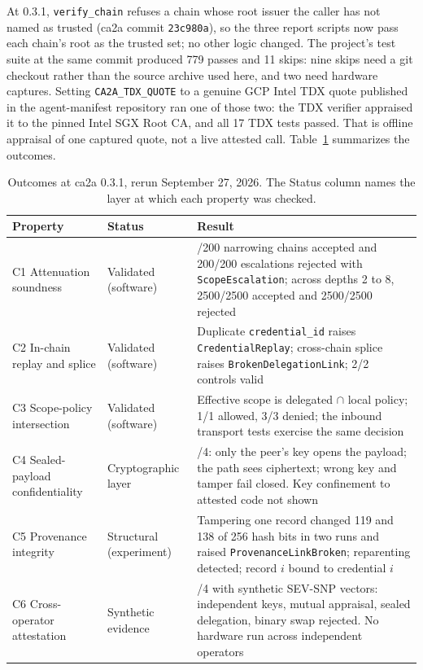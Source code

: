At 0.3.1, \texttt{verify\_chain} refuses a chain whose root issuer the caller has not named as
trusted (ca2a commit \texttt{23c980a}), so the three report scripts now pass each chain's root as
the trusted set; no other logic changed. The project's test suite at the same commit produced 779
passes and 11 skips: nine skips need a git checkout rather than the source archive used here, and
two need hardware captures. Setting \texttt{CA2A\_TDX\_QUOTE} to a genuine GCP Intel TDX quote
published in the agent-manifest repository ran one of those two: the TDX verifier appraised it to
the pinned Intel SGX Root CA, and all 17 TDX tests passed. That is offline appraisal of one
captured quote, not a live attested call. Table~\ref{tab:ca2a-results} summarizes the outcomes.

\begin{table}[h]
\centering
\caption{Outcomes at ca2a 0.3.1, rerun September 27, 2026. The Status column names the layer at
which each property was checked.}
\label{tab:ca2a-results}
\small
\begin{tabular}{>{\raggedright\arraybackslash}p{3.3cm}>{\raggedright\arraybackslash}p{2.6cm}>{\raggedright\arraybackslash}p{8.2cm}}
\toprule
Property & Status & Result \\
\midrule
C1 Attenuation soundness & Validated (software) & 200/200 narrowing chains accepted and 200/200 escalations rejected with \texttt{ScopeEscalation}; across depths 2 to 8, 2500/2500 accepted and 2500/2500 rejected \\
C2 In-chain replay and splice & Validated (software) & Duplicate \texttt{credential\_id} raises \texttt{CredentialReplay}; cross-chain splice raises \texttt{BrokenDelegationLink}; 2/2 controls valid \\
C3 Scope-policy intersection & Validated (software) & Effective scope is delegated $\cap$ local policy; 1/1 allowed, 3/3 denied; the inbound transport tests exercise the same decision \\
C4 Sealed-payload confidentiality & Cryptographic layer & 4/4: only the peer's key opens the payload; the path sees ciphertext; wrong key and tamper fail closed. Key confinement to attested code not shown \\
C5 Provenance integrity & Structural (experiment) & Tampering one record changed 119 and 138 of 256 hash bits in two runs and raised \texttt{ProvenanceLinkBroken}; reparenting detected; record $i$ bound to credential $i$ \\
C6 Cross-operator attestation & Synthetic evidence & 4/4 with synthetic SEV-SNP vectors: independent keys, mutual appraisal, sealed delegation, binary swap rejected. No hardware run across independent operators \\
\bottomrule
\end{tabular}
\end{table}

